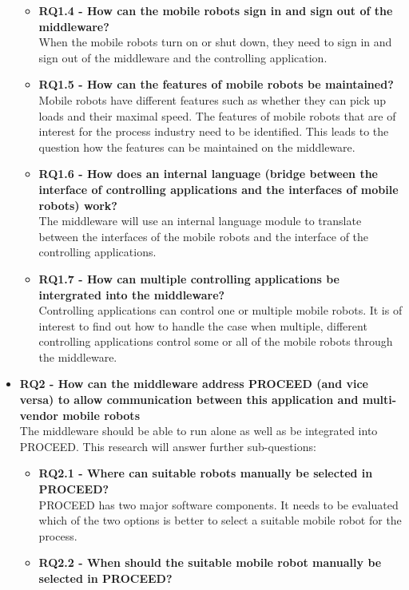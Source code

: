 \begin{itemize}
\begin{itemize}
     \item \textbf{RQ1.4 - How can the mobile robots sign in and sign out of the middleware?} \hfill \\ 
When the mobile robots turn on or shut down, they need to sign in and sign out of the middleware and the controlling application.
     \item \textbf{RQ1.5 - How can the features of mobile robots be maintained?} \hfill \\ 
Mobile robots have different features such as whether they can pick up loads and their maximal speed. The features of mobile robots that are of interest for the process industry need to be identified. This leads to the question how the features can be maintained on the middleware.
     \item \textbf{RQ1.6 - How does an internal language (bridge between the interface of controlling applications and the interfaces of mobile robots) work?} \hfill \\ 
The middleware will use an internal language module to translate between the interfaces of the mobile robots and the interface of the controlling applications.
     \item \textbf{RQ1.7 - How can multiple controlling applications be intergrated into the middleware?} \hfill \\ 
Controlling applications can control one or multiple mobile robots. It is of interest to find out how to handle the case when multiple, different controlling applications control some or all of the mobile robots through the middleware.
\end{itemize}
   \item \textbf{RQ2 - How can the middleware address PROCEED (and vice versa) to allow communication between this application and multi-vendor mobile robots} \hfill \\ 
The middleware should be able to run alone as well as be integrated into PROCEED. This research will answer further sub-questions:
   \begin{itemize}
     \item \textbf{RQ2.1 - Where can suitable robots manually be selected in PROCEED?} \hfill \\ 
PROCEED has two major software components. It needs to be evaluated which of the two options is better to select a suitable mobile robot for the process.
     \item \textbf{RQ2.2 - When should the suitable mobile robot manually be selected in PROCEED?} \hfill \\ 

\end{itemize}
\end{itemize}
